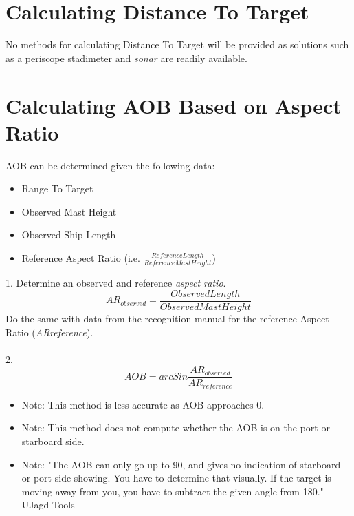 \documentclass{article}
\begin{document}
\section{Calculating Distance To Target}

No methods for calculating Distance To Target will be provided as solutions such as a periscope stadimeter and \emph{sonar} are readily available.

\section{Calculating AOB Based on Aspect Ratio}

AOB can be determined given the following data:
\begin{itemize}
\item{Range To Target}
\item{Observed Mast Height}
\item{Observed Ship Length}
\item{Reference Aspect Ratio (i.e. $\frac{Reference Length}{Reference Mast Height}$)}
\end{itemize}

1. Determine an observed and reference \emph{aspect ratio}.
$$AR_{observed} = \frac{Observed Length}{Observed Mast Height}$$
Do the same with data from the recognition manual for the reference Aspect Ratio (\emph{ARreference}). \\ \\
2.
$$AOB = arcSin \frac{AR_{observed}}{AR_{reference}}$$

\begin{itemize}
\item{Note: This method is less accurate as AOB approaches 0.}
\item{Note: This method does not compute whether the AOB is on the port or starboard side.}
\item{Note: "The AOB can only go up to 90, and gives no indication of starboard or port side showing. You have to determine that visually. If the target is moving away from you, you have to subtract the given angle from 180." -UJagd Tools}
\end{itemize}
\end{document}
